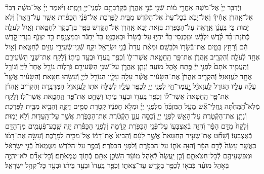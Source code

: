 \documentclass[twoside, openany, parskip=half, 11pt]{book}
\begin{document}
\begin{footnotesize}
\begin{multicols}{2}
\\
וַיְֿדַבֵּ֤ר יְיָ֙ אֶל־מֹשֶׁ֔ה אַֽחֲרֵ֣י מ֔וֹת שְֿׁנֵ֖י בְּֿנֵ֣י אַֽהֲרֹ֑ן בְּֿקָרְֿבָתָ֥ם לִפְנֵֽי־יְיָ֖ וַיָּמֻֽתוּ׃ וַיֹּ֨אמֶר יְיָ֜ אֶל־מֹשֶׁ֗ה דַּבֵּר֘ אֶל־אַֽהֲרֹ֣ן אָחִ֒יךָ֒ וְֿאַל־יָבֹ֤א בְֿכׇל־עֵת֙ אֶל־הַקֹּ֔דֶשׁ מִבֵּ֖ית לַפָּרֹ֑כֶת אֶל־פְּֿנֵ֨י הַכַּפֹּ֜רֶת אֲשֶׁ֤ר עַל־הָֽאָרֹן֙ וְֿלֹ֣א יָמ֔וּת כִּ֚י בֶּֽעָנָ֔ן אֵֽרָאֶ֖ה עַל־הַכַּפֹּֽרֶת׃ בְּֿזֹ֛את יָבֹ֥א אַֽהֲרֹ֖ן אֶל־הַקֹּ֑דֶשׁ בְּֿפַ֧ר בֶּן־בָּקָ֛ר לְֿחַטָּ֖את וְֿאַ֥יִל לְֿעֹלָֽה׃ כְּֿתֹֽנֶת־בַּ֨ד קֹ֜דֶשׁ יִלְבָּ֗שׁ וּמִֽכְנְסֵי־בַד֘ יִהְי֣וּ עַל־בְּֿשָׂרוֹ֒ וּבְאַבְנֵ֥ט בַּד֙ יַחְגֹּ֔ר וּבְמִצְנֶ֥פֶת בַּ֖ד יִצְנֹ֑ף בִּגְדֵי־קֹ֣דֶשׁ הֵ֔ם וְֿרָחַ֥ץ בַּמַּ֛יִם אֶת־בְּֿשָׂר֖וֹ וּלְבֵשָֽׁם׃ וּמֵאֵ֗ת עֲדַת֙ בְּֿנֵ֣י יִשְׂרָאֵ֔ל יִקַּ֛ח שְֿׁנֵֽי־שְֿׂעִירֵ֥י עִזִּ֖ים לְֿחַטָּ֑את וְֿאַ֥יִל אֶחָ֖ד לְֿעֹלָֽה׃ וְֿהִקְרִ֧יב אַֽהֲרֹ֛ן אֶת־פַּ֥ר הַֽחַטָּ֖את אֲשֶׁר־ל֑וֹ וְֿכִפֶּ֥ר בַּֽעֲד֖וֹ וּבְעַ֥ד בֵּיתֽוֹ׃  וְֿלָקַ֖ח אֶת־שְׁנֵ֣י הַשְּֿׂעִירִ֑ם וְֿהֶֽעֱמִ֤יד אֹתָם֙ לִפְנֵ֣י יְיָ֔ פֶּ֖תַח אֹ֥הֶל מוֹעֵֽד׃ וְֿנָתַ֧ן אַֽהֲרֹ֛ן עַל־שְׁנֵ֥י הַשְּֿׂעִירִ֖ם גֹּֽרָל֑וֹת גּוֹרָ֤ל אֶחָד֙ לַֽיְיָ֔ וְֿגוֹרָ֥ל אֶחָ֖ד לַֽעֲזָאזֵֽל׃ וְֿהִקְרִ֤יב אַֽהֲרֹן֙ אֶת־הַשָּׂעִ֔יר אֲשֶׁ֨ר עָלָ֥ה עָלָ֛יו הַגּוֹרָ֖ל לַֽיְיָ֑ וְֿעָשָׂ֖הוּ חַטָּֽאת׃ וְֿהַשָּׂעִ֗יר אֲשֶׁ֖ר֩ עָלָ֨ה עָלָ֤יו הַגּוֹרָל֙ לַֽעֲזָאזֵ֔ל יׇׇׇׇׇׇׇׇׇׇָֽעֳמַד־חַ֛י לִפְנֵ֥י יְיָ֖ לְֿכַפֵּ֣ר עָלָ֑יו לְֿשַׁלַּ֥ח אֹת֛וֹ לַֽעֲזָאזֵ֖ל הַמִּדְבָּֽרָה׃ וְֿהִקְרִ֨יב אַֽהֲרֹ֜ן אֶת־פַּ֤ר הַֽחַטָּאת֙ אֲשֶׁר־ל֔וֹ וְֿכִפֶּ֥ר בַּֽעֲד֖וֹ וּבְעַ֣ד בֵּית֑וֹ וְֿשָׁחַ֛ט אֶת־פַּ֥ר הַֽחַטָּ֖את אֲשֶׁר־לֽוֹ׃  וְֿלָקַ֣ח מְֿלֹֽא־הַ֠מַּחְתָּ֠ה גַּֽחֲלֵי־אֵ֞שׁ מֵעַ֤ל הַמִּזְבֵּ֨חַ֙ מִלִּפְנֵ֣י יְיָ֔ וּמְלֹ֣א חָפְֿנָ֔יו קְֿטֹ֥רֶת סַמִּ֖ים דַּקָּ֑ה וְֿהֵבִ֖יא מִבֵּ֥ית לַפָּרֹֽכֶת׃ וְֿנָתַ֧ן אֶת־הַקְּֿטֹ֛רֶת עַל־הָאֵ֖שׁ לִפְנֵ֣י יְיָ֑ וְֿכִסָּ֣ה עֲנַ֣ן הַקְּֿטֹ֗רֶת אֶת־הַכַּפֹּ֛רֶת אֲשֶׁ֥ר עַל־הָֽעֵד֖וּת וְֿלֹ֥א יָמֽוּת׃ וְֿלָקַח֙ מִדַּ֣ם הַפָּ֔ר וְֿהִזָּ֧ה בְֿאֶצְבָּע֛וֹ עַל־פְּֿנֵ֥י הַכַּפֹּ֖רֶת קֵ֑דְֿמָה וְֿלִפְנֵ֣י הַכַּפֹּ֗רֶת יַזֶּ֧ה שֶֽׁבַע־פְּֿעָמִ֛ים מִן־הַדָּ֖ם בְּֿאֶצְבָּעֽוֹ׃ וְֿשָׁחַ֞ט אֶת־שְׂעִ֤יר הַֽחַטָּאת֙ אֲשֶׁ֣ר לָעָ֔ם וְֿהֵבִיא֙ אֶת־דָּמ֔וֹ אֶל־מִבֵּ֖ית לַפָּרֹ֑כֶת וְֿעָשָׂ֣ה אֶת־דָּמ֗וֹ כַּֽאֲשֶׁ֤ר עָשָׂה֙ לְֿדַ֣ם הַפָּ֔ר וְֿהִזָּ֥ה אֹת֛וֹ עַל־הַכַּפֹּ֖רֶת וְֿלִפְנֵ֥י הַכַּפֹּֽרֶת׃ וְֿכִפֶּ֣ר עַל־הַקֹּ֗דֶשׁ מִטֻּמְאֹת֙ בְּֿנֵ֣י יִשְׂרָאֵ֔ל וּמִפִּשְׁעֵיהֶ֖ם לְֿכׇל־חַטֹּאתָ֑ם וְֿכֵ֤ן יַֽעֲשֶׂה֙ לְֿאֹ֣הֶל מוֹעֵ֔ד הַשֹּׁכֵ֣ן אִתָּ֔ם בְּֿת֖וֹךְ טֻמְאֹתָֽם׃ וְֿכׇל־אָדָ֞ם לֹא־יִֽהְיֶ֣ה בְּֿאֹ֣הֶל מוֹעֵ֗ד בְּֿבֹא֛וֹ לְֿכַפֵּ֥ר בַּקֹּ֖דֶשׁ עַד־צֵאת֑וֹ וְֿכִפֶּ֤ר בַּֽעֲדוֹ֙ וּבְעַ֣ד בֵּית֔וֹ וּבְעַ֖ד כׇּל־קְהַ֥ל יִשְׂרָאֵֽל׃


\end{multicols}
\end{footnotesize}
\end{document}
